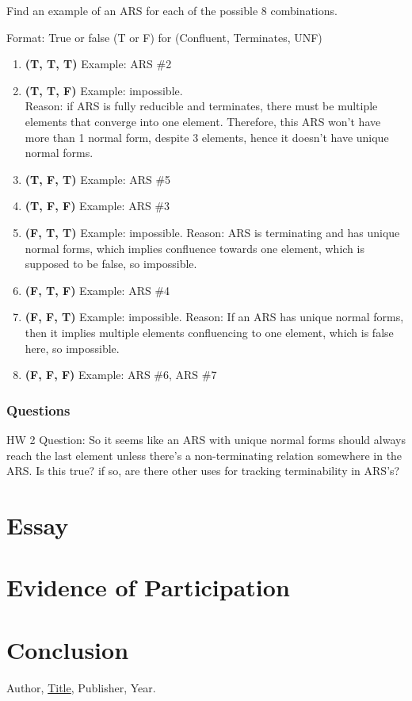 \documentclass{article}
\theoremstyle{plain}
\theoremstyle{definition}
\theoremstyle{remark}
\begin{document}
Find an example of an ARS for each of the possible 8 combinations.

Format: True or false (T or F) for (Confluent, Terminates, UNF)

\begin{enumerate}
    \item \textbf{(T, T, T)} 
    Example: ARS \#2

    \item \textbf{(T, T, F)} 
    Example: impossible. \\
    Reason: if ARS is fully reducible and terminates, there must be multiple elements that converge into one element. Therefore, this ARS won't have more than 1 normal form, despite 3 elements, hence it doesn’t have unique normal forms.

    \item \textbf{(T, F, T)} 
    Example: ARS \#5

    \item \textbf{(T, F, F)} 
    Example: ARS \#3

    \item \textbf{(F, T, T)} 
    Example: impossible. 
    Reason: ARS is terminating and has unique normal forms, which implies confluence towards one element, which 
    is supposed to be false, so impossible.

    \item \textbf{(F, T, F)} 
    Example: ARS \#4

    \item \textbf{(F, F, T)} 
    Example: impossible. 
    Reason: If an ARS has unique normal forms, then it implies multiple elements confluencing to one element, which is
    false here, so impossible.

    \item \textbf{(F, F, F)} 
    Example: ARS \#6, ARS \#7
\end{enumerate}

\subsubsection{Questions}

HW 2 Question: So it seems like an ARS with unique normal forms should always reach the last element unless there's a non-terminating relation somewhere in the ARS. 
Is this true? if so, are there other uses for tracking terminability in ARS's?

\section{Essay}

\section{Evidence of Participation}

\section{Conclusion}\label{conclusion}

\begin{thebibliography}{99}
 Author, \href{https://en.wikipedia.org/wiki/LaTeX}{Title}, Publisher, Year.
\end{thebibliography}
\end{document}
